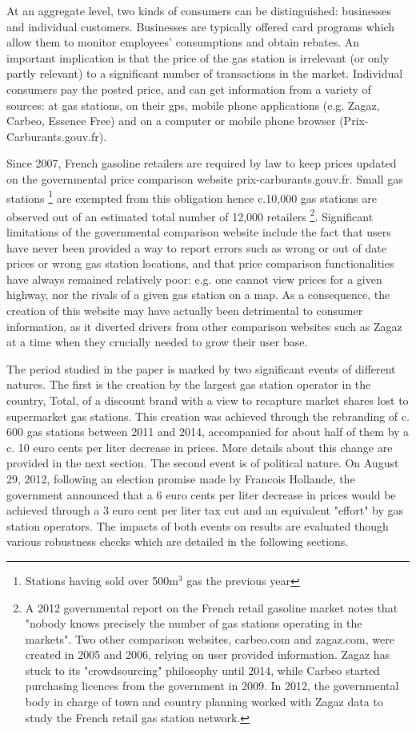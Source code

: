 \documentclass[english]{article}
\begin{document}
At an aggregate level, two kinds of consumers can be distinguished: businesses and individual customers. Businesses are typically offered card programs which allow them to monitor employees' consumptions and obtain rebates. An important implication is that the price of the gas station is irrelevant (or only partly relevant) to a significant number of transactions in the market. Individual consumers pay the posted price, and can get information from a variety of sources: at gas stations, on their gps, mobile phone applications (e.g. Zagaz, Carbeo, Essence Free) and on a computer or mobile phone browser (Prix-Carburants.gouv.fr).

Since 2007, French gasoline retailers are required by law to keep prices updated on the governmental price comparison website prix-carburants.gouv.fr. Small gas stations%
\footnote{Stations having sold over 500m$^{3}$ gas the previous year%
} are exempted from this obligation hence c.10,000 gas stations are observed out of an estimated total number of 12,000 retailers%
\footnote{A 2012 governmental report on the French retail gasoline market notes that "nobody knows precisely the number of gas stations operating in the markets". Two other comparison websites, carbeo.com and zagaz.com, were created in 2005 and 2006, relying on user provided information. Zagaz has stuck to its "crowdsourcing" philosophy until 2014, while Carbeo started purchasing licences from the government in 2009. In 2012, the governmental body in charge of town and country planning worked with Zagaz data to study the French retail gas station network.%
}.
Significant limitations of the governmental comparison website include the fact that users have never been provided a way to report errors such as wrong or out of date prices or wrong gas station locations, and that price comparison functionalities have always remained relatively poor: e.g. one cannot view prices for a given highway, nor the rivals of a given gas station on a map. As a consequence, the creation of this website may have actually been detrimental to consumer information, as it diverted drivers from other comparison websites such as Zagaz at a time when they crucially needed to grow their user base.

The period studied in the paper is marked by two significant events of different natures. The first is the creation by the largest gas station operator in the country, Total, of a discount brand with a view to recapture market shares lost to supermarket gas stations. This creation was achieved through the rebranding of c. 600 gas stations between 2011 and 2014, accompanied for about half of them by a c. 10 euro cents per liter decrease in prices. More details about this change are provided in the next section. The second event is of political nature. On August 29, 2012, following an election promise made by Francois Hollande, the government announced that a 6 euro cents per liter decrease in prices would be achieved through a 3 euro cent per liter tax cut and an equivalent "effort" by gas station operators. The impacts of both events on results are evaluated though various robustness checks which are detailed in the following sections.
\end{document}
